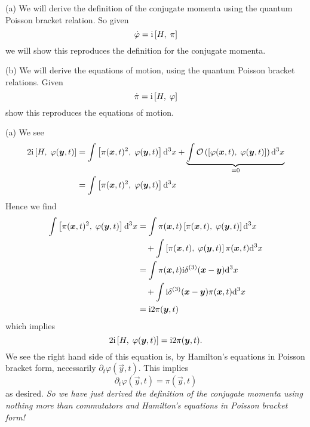 \begin{xca}
(a) We will derive the definition of the conjugate momenta using the
  quantum Poisson bracket relation. So given
\begin{equation}
\dot{\varphi}={\rm i}\left\lbrack H,\;\pi\right\rbrack
\end{equation}
we will show this reproduces the definition for the conjugate momenta.

(b) We will derive the equations of motion, using the quantum Poisson
bracket relations. Given
\begin{equation}
\dot{\pi}={\rm i}\left\lbrack H,\;\varphi\right\rbrack
\end{equation}
show this reproduces the equations of motion.
\end{xca}
\begin{soln}
(a) We see
\begin{equation}
\begin{split}
2\I\commutator{H}{\varphi(\vec{y},t)}
&=\int\commutator{\pi(\vec{x},t)^{2}}{\varphi(\vec{y},t)}\D^{3}x
+\underbrace{\int\bigO{\commutator{\varphi(\vec{x},t)}{\varphi(\vec{y},t)}}\D^{3}x}_{=0}\\
&=\int\commutator{\pi(\vec{x},t)^{2}}{\varphi(\vec{y},t)}\D^{3}x
\end{split}
\end{equation}
Hence we find
\begin{subequations}
\begin{align}
\int\commutator{\pi(\vec{x},t)^{2}}{\varphi(\vec{y},t)}\D^{3}x
&=\int\pi(\vec{x},t)\commutator{\pi(\vec{x},t)}{\varphi(\vec{y},t)}\D^{3}x\nonumber\\
&\quad+\int\commutator{\pi(\vec{x},t)}{\varphi(\vec{y},t)}\pi(\vec{x},t)\D^{3}x\\
&=\int\pi(\vec{x},t)\I\delta^{(3)}(\vec{x}-\vec{y})\D^{3}x\nonumber\\
&\quad+\int\I\delta^{(3)}(\vec{x}-\vec{y})\pi(\vec{x},t)\D^{3}x\\
&=\I 2\pi(\vec{y},t)
\end{align}
\end{subequations}
which implies
\begin{equation}
2\I\commutator{H}{\varphi(\vec{y},t)}=\I 2\pi(\vec{y},t).
\end{equation}
We see the right hand side of this equation is, by Hamilton's equations
in Poisson bracket form, necessarily
$\partial_{t}\varphi(\vec{y},t)$. This implies
\begin{equation}
\partial_{t}\varphi(\vec{y},t)=\pi(\vec{y},t)
\end{equation}
as desired. \emph{So we have just derived the definition of the conjugate momenta using nothing more than commutators and Hamilton's equations in Poisson bracket form!}


\end{soln}
